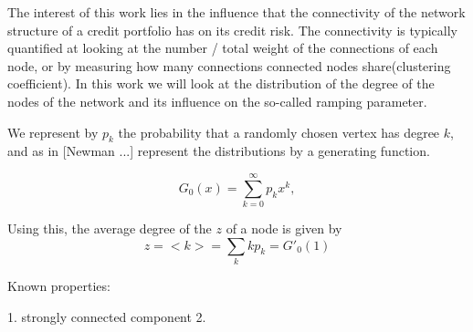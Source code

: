 The interest of this work lies in the influence that the connectivity of the network structure of a credit portfolio has on its credit risk.
The connectivity is typically quantified at looking at the number / total weight of the connections of each node, or by measuring how many connections connected nodes share(clustering coefficient).
In this work we will look at the distribution of the degree of the nodes of the network and its influence on the so-called ramping parameter.

We represent by $p_k$ the probability that a randomly chosen vertex has degree $k$, and as in [Newman ...] represent the distributions by a generating function.

\begin{equation}
	G_0(x) = \sum_{k=0}^{\infty} p_k x^k,
\end{equation}

Using this, the average degree of the $z$ of a node is given by
\begin{equation}
	z = \lt k \gt = \sum_k k p_k = G'_0(1)
\end{equation}







Known properties:

1. strongly connected component
2. 